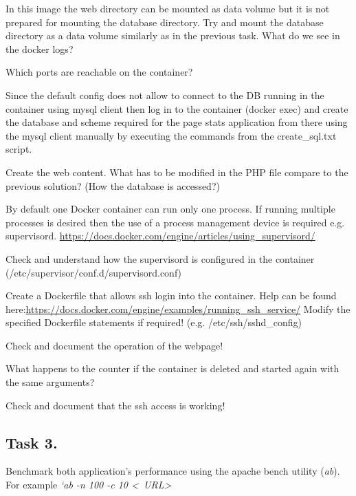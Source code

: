 \documentclass[a4paper]{article}
\begin{document}
In this image the web directory can be mounted as data volume but it is not prepared for mounting the database directory. Try and mount the database directory as a data volume similarly as in the previous task. What do we see in the docker logs?

Which ports are reachable on the container?

Since the default config does not allow to connect to the DB running in the container using mysql client then log in to the container (docker exec) and create the database and scheme required for the page stats application from there using the mysql client manually by executing the commands from the create\_sql.txt script.

Create the web content. What has to be modified in the PHP file compare to the previous solution? (How the database is accessed?)

By default one Docker container can run only one process. If running multiple processes is desired then the use of a process management device is required e.g. supervisord. \url{https://docs.docker.com/engine/articles/using_supervisord/}

Check and understand how the supervisord is configured in the container (/etc/supervisor/conf.d/supervisord.conf)

Create a Dockerfile that allows ssh login into the container. Help can be found here:\url{https://docs.docker.com/engine/examples/running_ssh_service/} Modify the specified Dockerfile statements if required! (e.g. /etc/ssh/sshd\_config)

Check and document the operation of the webpage!


What happens to the counter if the container is deleted and started again with the same arguments?

Check and document that the ssh access is working!

\subsection{Task 3.}

Benchmark both application's performance using the apache bench utility (\emph{ab}). For example \emph{`ab -n 100 -c 10 \textless~URL\textgreater}
\end{document}
